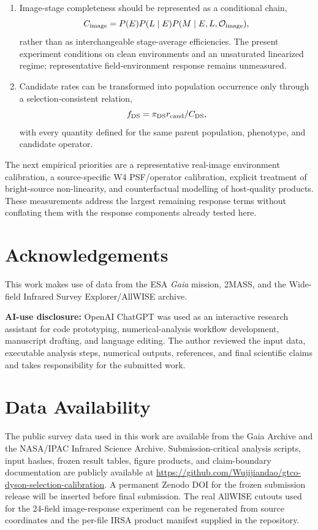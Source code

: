 \documentclass[fleqn,usenatbib]{mnras}
\begin{document}
\begin{enumerate}
\item Image-stage completeness should be represented as a conditional chain,
\begin{equation}
C_{\rm image}=P(E)P(L\mid E)P(M\mid E,L,\mathcal{O}_{\rm image}),
\end{equation}
rather than as interchangeable stage-average efficiencies. The present experiment conditions on clean environments and an unsaturated linearized regime; representative field-environment response remains unmeasured.

\item Candidate rates can be transformed into population occurrence only through a selection-consistent relation,
\begin{equation}
f_{\rm DS}=\pi_{\rm DS}r_{\rm cand}/C_{\rm DS},
\end{equation}
with every quantity defined for the same parent population, phenotype, and candidate operator.
\end{enumerate}

The next empirical priorities are a representative real-image environment calibration, a source-specific W4 PSF/operator calibration, explicit treatment of bright-source non-linearity, and counterfactual modelling of host-quality products. These measurements address the largest remaining response terms without conflating them with the response components already tested here.

\section*{Acknowledgements}

This work makes use of data from the ESA \textit{Gaia} mission, 2MASS, and the Wide-field Infrared Survey Explorer/AllWISE archive.

\textbf{AI-use disclosure:} OpenAI ChatGPT was used as an interactive research assistant for code prototyping, numerical-analysis workflow development, manuscript drafting, and language editing. The author reviewed the input data, executable analysis steps, numerical outputs, references, and final scientific claims and takes responsibility for the submitted work.

\section*{Data Availability}

The public survey data used in this work are available from the Gaia Archive and the NASA/IPAC Infrared Science Archive. Submission-critical analysis scripts, input hashes, frozen result tables, figure products, and claim-boundary documentation are publicly available at \url{https://github.com/Wujijiandao/gtco-dyson-selection-calibration}. A permanent Zenodo DOI for the frozen submission release will be inserted before final submission. The real AllWISE cutouts used for the 24-field image-response experiment can be regenerated from source coordinates and the per-file IRSA product manifest supplied in the repository.
\end{document}
